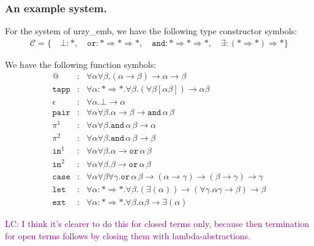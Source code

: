 \documentclass[runningheads,a4paper]{llncs}
\newcommand{\TypeConstructors}{\mathcal{C}}
\newcommand{\arrtype}{\rightarrow}
\newcommand{\arrkind}{\Rightarrow}
\newcommand{\LC}[1]{\textcolor{purple}{LC: #1}}
\begin{document}
\subsubsection{An example system.}

For the system of urzy\_emb, we have the following type constructor
symbols:
\[
\begin{array}{c}
\TypeConstructors = \{\quad
  \bot : *,\quad
  \mathtt{or} : * \arrkind * \arrkind *,\quad
  \mathtt{and} : * \arrkind * \arrkind *,\quad
  \exists : (* \arrkind *) \arrkind *
  \}
\end{array}
\]

We have the following function symbols:
\[
\begin{array}{rcl}
@ & : & \forall \alpha \forall \beta . (\alpha \arrtype \beta) \arrtype \alpha \arrtype \beta \\
\mathtt{tapp} & : & \forall \alpha : * \arrkind * . \forall \beta .
  (\forall \beta [\alpha \beta]) \arrtype \alpha \beta \\
\epsilon & : & \forall \alpha . \bot \arrtype \alpha \\
\mathtt{pair} & : & \forall \alpha \forall \beta . \alpha \arrtype \beta \arrtype
  \mathtt{and}\, \alpha\, \beta \\
\pi^1 & : & \forall \alpha \forall \beta . \mathtt{and}\, \alpha\, \beta \arrtype \alpha \\
\pi^2 & : & \forall \alpha \forall \beta . \mathtt{and}\, \alpha\, \beta \arrtype \beta \\
\mathtt{in}^1 & : & \forall \alpha \forall \beta . \alpha \arrtype
  \mathtt{or}\, \alpha\, \beta \\
\mathtt{in}^2 & : & \forall \alpha \forall \beta . \beta \arrtype
  \mathtt{or}\, \alpha\, \beta \\
\mathtt{case} & : & \forall \alpha \forall \beta \forall \gamma . \mathtt{or}\, \alpha\, \beta \arrtype
  (\alpha \arrtype \gamma) \arrtype (\beta \arrtype \gamma) \arrtype \gamma \\
\mathtt{let} & : & \forall \alpha : * \arrkind * . \forall \beta .
  (\exists (\alpha)) \arrtype
  (\forall \gamma . \alpha \gamma \arrtype \beta) \arrtype \beta \\
\mathtt{ext} & : & \forall \alpha : * \arrkind * . \forall \beta . \alpha \beta \arrtype
  \exists (\alpha)
\end{array}
\]

\LC{I think it's clearer to do this for closed terms only,
  because then termination for open terms follows by closing them with
  lambda-abstractions.}
\end{document}
